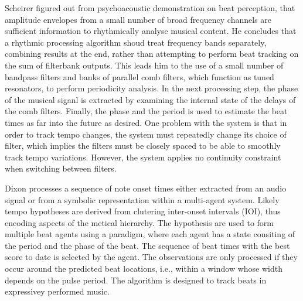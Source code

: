 \documentclass{scrartcl}
\begin{document}
Scheirer \cite{Scheirer1998} figured out from psychoacoustic demonstration on beat perception, that amplitude envelopes from a small number of broad frequency channels are sufficient information to rhythmically analyse musical content. He concludes that a rhythmic processing algorithm shoud treat frequency bands separately, combining results at the end, rather than attempting to perform beat tracking on the sum of filterbank outputs. This leads him to the use of a small number of bandpass filters and banks of parallel comb filters, which function as tuned resonators, to perform periodicity analysis. In the next processing step, the phase of the musical siganl is extracted by examining the internal state of the delays of the comb filters. Finally, the phase and the period is used to estimate the beat times as far into the future as desired. One problem with the system is that in order to track tempo changes, the system must repeatedly change its choice of filter, which implies the filters must be closely spaced to be able to smoothly track tempo variations. However, the system applies no continuity constraint when switching between filters.  

Dixon \cite{Dixon2001} processes a sequence of note onset times either extracted from an audio signal or from a symbolic representation within a multi-agent system. Likely tempo hypotheses are derived from clutering inter-onset intervals (IOI), thus encoding aspects of the metical hierarchy. The hypothesis are used to form multiple beat agents using a paradigm, where each agent has a state consiting of the period and the phase of the beat. The sequence of beat times with the best score to date is selected by the agent. The observations are only processed if they occur around the predicted beat locations, i.e., within a window whose width depends on the pulse period. The algorithm is designed to track beats in expressivey performed music.

\end{document}
